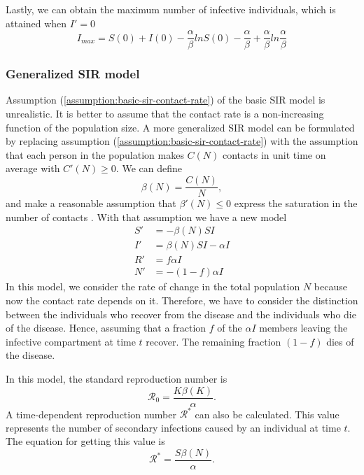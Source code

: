 Lastly, we can obtain the maximum number of infective individuals, which is attained when $I' = 0$ \cite{brauerCompartmentalModelsEpidemiology2008}
\begin{equation*}
    I_{max} = S(0) + I(0) - \frac{\alpha}{\beta} ln S(0) - \frac{\alpha}{\beta} + \frac{\alpha}{\beta} ln \frac{\alpha}{\beta}
\end{equation*}

\subsubsection{Generalized SIR model}
\label{sec:literature-review-generalized-sir-model}

Assumption (\ref{assumption:basic-sir-contact-rate}) of the basic \gls{SIR} model is unrealistic.
It is better to assume that the contact rate is a non-increasing function of the population size.
A more generalized \gls{SIR} model can be formulated by replacing assumption (\ref{assumption:basic-sir-contact-rate}) with the assumption that each person in the population makes $C(N)$ contacts in unit time on average with $C'(N) \geq 0$.
We can define
\begin{equation*}
    \beta(N) = \frac{C(N)}{N},
\end{equation*}
and make a reasonable assumption that $\beta'(N) \leq 0$ express the saturation in the number of contacts \cite{brauerCompartmentalModelsEpidemiology2008}.
With that assumption we have a new model
\begin{align*}
    S' &= - \beta(N)SI \\
    I' &= \beta(N)SI - \alpha I \\
    R' &= f \alpha I \\
    N' &= - (1 - f) \alpha I
\end{align*}
In this model, we consider the rate of change in the total population $N$ because now the contact rate depends on it.
Therefore, we have to consider the distinction between the individuals who recover from the disease and the individuals who die of the disease.
Hence, assuming that a fraction $f$ of the $\alpha I$ members leaving the infective compartment at time $t$ recover.
The remaining fraction $(1 - f)$ dies of the disease.

In this model, the standard reproduction number is \cite{brauerCompartmentalModelsEpidemiology2008}
\begin{equation}
    \mathcal{R}_0 = \frac{K\beta(K)}{\alpha}.
    \label{eq:generalized-sir-r0}
\end{equation}
A time-dependent reproduction number $\mathcal{R}^*$ can also be calculated.
This value represents the number of secondary infections caused by an individual at time $t$.
The equation for getting this value is \cite{brauerCompartmentalModelsEpidemiology2008}
\begin{equation*}
    \mathcal{R}^* = \frac{S\beta(N)}{\alpha}.
\end{equation*}

